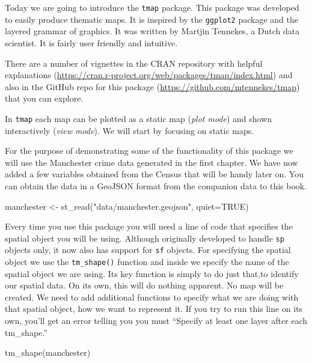 \documentclass[
  krantz2]{krantz}
\makeatletter
\newenvironment{Shaded}{\begin{snugshade}}{\end{snugshade}}
\newcommand{\AttributeTok}[1]{\textcolor[rgb]{0.61,0.61,0.61}{#1}}
\newcommand{\ConstantTok}[1]{\textcolor[rgb]{0,0,0}{#1}}
\newcommand{\FunctionTok}[1]{\textcolor[rgb]{0,0,0}{#1}}
\newcommand{\NormalTok}[1]{#1}
\newcommand{\OtherTok}[1]{\textcolor[rgb]{0.37,0.37,0.37}{#1}}
\newcommand{\StringTok}[1]{\textcolor[rgb]{0.5,0.5,0.5}{#1}}
\newenvironment{kframe}{%
\medskip{}
\setlength{\fboxsep}{.8em}
 \def\at@end@of@kframe{}%
 \ifinner\ifhmode%
  \def\at@end@of@kframe{\end{minipage}}%
  \begin{minipage}{\columnwidth}%
 \fi\fi%
 \def\FrameCommand##1{\hskip\@totalleftmargin \hskip-\fboxsep
 \colorbox{shadecolor}{##1}\hskip-\fboxsep
     \hskip-\linewidth \hskip-\@totalleftmargin \hskip\columnwidth}%
 \MakeFramed {\advance\hsize-\width
   \@totalleftmargin\z@ \linewidth\hsize
   \@setminipage}}%
 {\par\unskip\endMakeFramed%
 \at@end@of@kframe}
\renewenvironment{Shaded}{\begin{kframe}}{\end{kframe}}
\makeatother
\begin{document}
Today we are going to introduce the \texttt{tmap} package. This package was developed to easily produce thematic maps. It is inspired by the \texttt{ggplot2} package and the layered grammar of graphics. It was written by Martjin Tennekes, a Dutch data scientist. It is fairly user friendly and intuitive.

There are a number of vignettes in the CRAN repository with helpful explanations (\url{https://cran.r-project.org/web/packages/tmap/index.html}) and also in the GitHub repo for this package (\url{https://github.com/mtennekes/tmap}) that you can explore.

In \texttt{tmap} each map can be plotted as a static map (\emph{plot mode}) and shown interactively (\emph{view mode}). We will start by focusing on static maps.

For the purpose of demonstrating some of the functionality of this package we will use the Manchester crime data generated in the first chapter. We have now added a few variables obtained from the Census that will be handy later on. You can obtain the data in a GeoJSON format from the companion data to this book.

\begin{Shaded}
\begin{Highlighting}[]
\NormalTok{manchester }\OtherTok{\textless{}{-}} \FunctionTok{st\_read}\NormalTok{(}\StringTok{"data/manchester.geojson"}\NormalTok{, }\AttributeTok{quiet=}\ConstantTok{TRUE}\NormalTok{)}
\end{Highlighting}
\end{Shaded}

Every time you use this package you will need a line of code that specifies the spatial object you will be using. Although originally developed to handle \texttt{sp} objects only, it now also has support for \texttt{sf} objects. For specifying the spatial object we use the \texttt{tm\_shape()} function and inside we specify the name of the spatial object we are using. Its key function is simply to do just that,to identify our spatial data. On its own, this will do nothing apparent. No map will be created. We need to add additional functions to specify what we are doing with that spatial object, how we want to represent it. If you try to run this line on its own, you'll get an error telling you you must ``Specify at least one layer after each tm\_shape.''

\begin{Shaded}
\begin{Highlighting}[]
\FunctionTok{tm\_shape}\NormalTok{(manchester)}
\end{Highlighting}
\end{Shaded}
\end{document}
